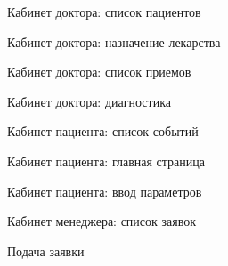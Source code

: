 
\begin{figure}[h]
\caption{Кабинет доктора: список пациентов}
\label{app:doctor_cabinet_patients}
\end{figure}

\newpage \begin{figure}[h]
\caption{Кабинет доктора: назначение лекарства}
\label{app:doctor_cabinet_medicament}
\end{figure}

\newpage \begin{figure}[h]
\caption{Кабинет доктора: список приемов}
\label{app:doctor_cabinet_appointments}
\end{figure}

\newpage \begin{figure}[h]
\caption{Кабинет доктора: диагностика}
\label{app:doctor_cabinet_diagnostic}
\end{figure}

\newpage \begin{figure}[h]
\caption{Кабинет пациента: список событий}
\label{app:patient_cabinet_events}
\end{figure}

\newpage \begin{figure}[h]
\caption{Кабинет пациента: главная страница}
\label{app:patient_cabinet_main}
\end{figure}

\newpage \begin{figure}[h]
\caption{Кабинет пациента: ввод параметров}
\label{app:patient_cabinet_parameters}
\end{figure}

\newpage \begin{figure}[h]
\caption{Кабинет менеджера: список заявок}
\label{app:manager_cabinet_bid}
\end{figure}

\newpage \begin{figure}[h]
\caption{Подача заявки}
\label{app:bid_form}
\end{figure}

